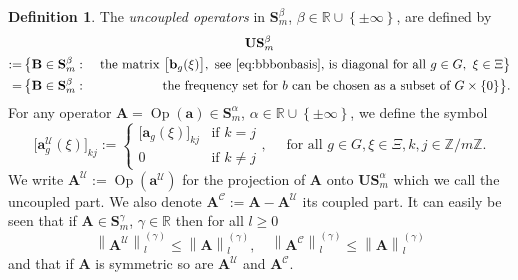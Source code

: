 \documentclass[10pt]{amsart}
\theoremstyle{definition}\newtheorem{defi}[theo]{Definition}\newtheorem{rema}[theo]{Remark}\newtheorem{exam}[theo]{Example}\newtheorem{nota}[theo]{Notation}
\DeclareMathOperator{\Op}{Op}
\newcommand{\R}{\mathbb R}
\newcommand{\Z}{\mathbb Z}
\newcommand{\CC}{\mathcal{C}}
\newcommand{\CU}{\mathcal{U}}
\newcommand{\ba}{\mathbf a}
\newcommand{\BA}{\mathbf A}
\newcommand{\BB}{\mathbf B}
\newcommand{\BS}{\mathbf S}
\newcommand{\BU}{\mathbf U}
\newcommand{\bbb}{\mathbf b}
\newcommand{\set}[1]{\left\{ #1 \right\}}
\newcommand{\snorm}[3]{\left\| #1\right\|_{#3}^{(#2)}}
\begin{document}
\begin{defi}\label{def:uncoupled}
The \emph{uncoupled operators} in $\BS_m^\beta$, $\beta\in\R\cup\set{\pm\infty}$, are defined by
\begin{multline}
\BU\BS_m^\beta\\
\begin{aligned}
:=&\,\big\{\BB\in\BS_m^\beta: \ &\text{the matrix } \big[\bbb_g(\xi)\big], \text{ see~\eqref{eq:bbbonbasis}, is diagonal for all }g\in G,\ \xi\in\Xi\big\}\\
=&\,\big\{\BB\in\BS_m^\beta: \ &\text{the frequency set for }b\text{ can be chosen as a subset of }G\times\{0\}\big\}.
\end{aligned}
\end{multline}
For any operator $\BA =\Op(\ba)\in \BS_m^\alpha$, $\alpha\in\R\cup\set{\pm\infty}$, we define the symbol
\begin{equation}\label{eq:uncoupled}
\big[\ba_g^\CU(\xi)\big]_{k j}:=
\begin{cases}
\big[\ba_g(\xi)\big]_{k j} & \text{if }k =j\\ 0 & \text{if } k\neq j
\end{cases},\quad\text{ for all }g\in G, \xi\in \Xi, k,j\in\Z/m\Z.
\end{equation}
We write $\BA^\CU := \Op(\ba^\CU)$ for the projection of $\BA$ onto $\BU\BS_m^\alpha$ which we call the uncoupled part. We also denote $\BA^{\CC} := \BA - \BA^{\CU}$ its coupled part. It can easily be seen that if $\BA \in
\BS_m^\gamma$, $\gamma \in \R$ then for all $l \ge 0$
\begin{equation}\label{eq:estpartuncbyfull}
\snorm{\BA^\CU}{\gamma}{l} \le \snorm{\BA}{\gamma}{l}, \quad
\snorm{\BA^\CC}{\gamma}{l} \le \snorm{\BA}{\gamma}{l}
\end{equation}
and that if $\BA$ is symmetric so are $\BA^\CU$ and $\BA^\CC$.
\end{defi}
\end{document}
